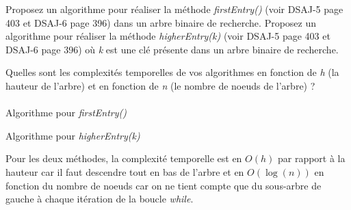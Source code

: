 Proposez un algorithme pour réaliser la méthode \textit{firstEntry()} (voir DSAJ-5
page 403 et DSAJ-6 page 396) dans un arbre binaire de recherche. Proposez un
algorithme pour réaliser la méthode \textit{higherEntry(k)} (voir DSAJ-5 page 403
et DSAJ-6 page 396) où \textit{k} est une clé présente dans un arbre binaire de recherche.

Quelles sont les complexités temporelles de vos algorithmes en fonction de \textit{h} (la
hauteur de l’arbre) et en fonction de \textit{n} (le nombre de noeuds de l’arbre) ?
\\
\\
Algorithme pour \textit{firstEntry()}

Algorithme pour \textit{higherEntry(k)}


Pour les deux méthodes, la complexité temporelle est en $O (h)$ par rapport à la hauteur car il faut descendre tout en bas de l'arbre et en $O (\log (n))$ en fonction du nombre de noeuds car on ne tient compte que du sous-arbre de gauche à chaque itération de la boucle \textit{while}.